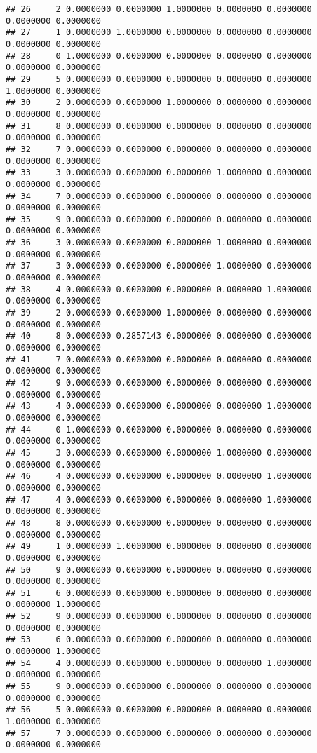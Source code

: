 \documentclass[
]{article}
\begin{document}
\begin{verbatim}
## 26     2 0.0000000 0.0000000 1.0000000 0.0000000 0.0000000 0.0000000 0.0000000
## 27     1 0.0000000 1.0000000 0.0000000 0.0000000 0.0000000 0.0000000 0.0000000
## 28     0 1.0000000 0.0000000 0.0000000 0.0000000 0.0000000 0.0000000 0.0000000
## 29     5 0.0000000 0.0000000 0.0000000 0.0000000 0.0000000 1.0000000 0.0000000
## 30     2 0.0000000 0.0000000 1.0000000 0.0000000 0.0000000 0.0000000 0.0000000
## 31     8 0.0000000 0.0000000 0.0000000 0.0000000 0.0000000 0.0000000 0.0000000
## 32     7 0.0000000 0.0000000 0.0000000 0.0000000 0.0000000 0.0000000 0.0000000
## 33     3 0.0000000 0.0000000 0.0000000 1.0000000 0.0000000 0.0000000 0.0000000
## 34     7 0.0000000 0.0000000 0.0000000 0.0000000 0.0000000 0.0000000 0.0000000
## 35     9 0.0000000 0.0000000 0.0000000 0.0000000 0.0000000 0.0000000 0.0000000
## 36     3 0.0000000 0.0000000 0.0000000 1.0000000 0.0000000 0.0000000 0.0000000
## 37     3 0.0000000 0.0000000 0.0000000 1.0000000 0.0000000 0.0000000 0.0000000
## 38     4 0.0000000 0.0000000 0.0000000 0.0000000 1.0000000 0.0000000 0.0000000
## 39     2 0.0000000 0.0000000 1.0000000 0.0000000 0.0000000 0.0000000 0.0000000
## 40     8 0.0000000 0.2857143 0.0000000 0.0000000 0.0000000 0.0000000 0.0000000
## 41     7 0.0000000 0.0000000 0.0000000 0.0000000 0.0000000 0.0000000 0.0000000
## 42     9 0.0000000 0.0000000 0.0000000 0.0000000 0.0000000 0.0000000 0.0000000
## 43     4 0.0000000 0.0000000 0.0000000 0.0000000 1.0000000 0.0000000 0.0000000
## 44     0 1.0000000 0.0000000 0.0000000 0.0000000 0.0000000 0.0000000 0.0000000
## 45     3 0.0000000 0.0000000 0.0000000 1.0000000 0.0000000 0.0000000 0.0000000
## 46     4 0.0000000 0.0000000 0.0000000 0.0000000 1.0000000 0.0000000 0.0000000
## 47     4 0.0000000 0.0000000 0.0000000 0.0000000 1.0000000 0.0000000 0.0000000
## 48     8 0.0000000 0.0000000 0.0000000 0.0000000 0.0000000 0.0000000 0.0000000
## 49     1 0.0000000 1.0000000 0.0000000 0.0000000 0.0000000 0.0000000 0.0000000
## 50     9 0.0000000 0.0000000 0.0000000 0.0000000 0.0000000 0.0000000 0.0000000
## 51     6 0.0000000 0.0000000 0.0000000 0.0000000 0.0000000 0.0000000 1.0000000
## 52     9 0.0000000 0.0000000 0.0000000 0.0000000 0.0000000 0.0000000 0.0000000
## 53     6 0.0000000 0.0000000 0.0000000 0.0000000 0.0000000 0.0000000 1.0000000
## 54     4 0.0000000 0.0000000 0.0000000 0.0000000 1.0000000 0.0000000 0.0000000
## 55     9 0.0000000 0.0000000 0.0000000 0.0000000 0.0000000 0.0000000 0.0000000
## 56     5 0.0000000 0.0000000 0.0000000 0.0000000 0.0000000 1.0000000 0.0000000
## 57     7 0.0000000 0.0000000 0.0000000 0.0000000 0.0000000 0.0000000 0.0000000

\end{verbatim}
\end{document}
